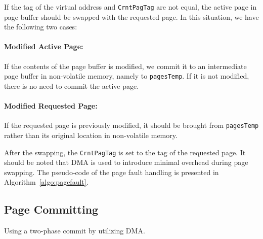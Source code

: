If the tag of the virtual address and \texttt{CrntPagTag} are not equal, the active page in page buffer should be swapped with the requested page. In this situation, we have the following two cases:

\paragraph{Modified Active Page:} If the contents of the page buffer is modified, we commit it to an intermediate page buffer in non-volatile memory, namely to \texttt{pagesTemp}. If it is not modified, there is no need to commit the active page.

\paragraph{Modified Requested Page:}  If the requested page is previously modified, it should be brought from \texttt{pagesTemp} rather than its original location in non-volatile memory. 

After the swapping, the \texttt{CrntPagTag} is set to the tag of the requested page. It should be noted that DMA is used to introduce minimal overhead during page swapping. The pseudo-code of the page fault handling is presented in Algorithm~\ref{algo:pagefault}.

\subsection{Page Committing}

Using a two-phase commit by utilizing DMA. 


